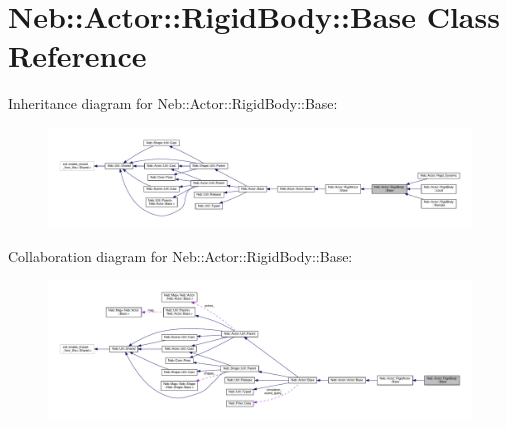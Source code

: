 \hypertarget{classNeb_1_1Actor_1_1RigidBody_1_1Base}{\section{Neb\-:\-:Actor\-:\-:Rigid\-Body\-:\-:Base Class Reference}
\label{classNeb_1_1Actor_1_1RigidBody_1_1Base}
}


Inheritance diagram for Neb\-:\-:Actor\-:\-:Rigid\-Body\-:\-:Base\-:
\nopagebreak
\begin{figure}[H]
\begin{center}
\leavevmode
\includegraphics[width=350pt]{classNeb_1_1Actor_1_1RigidBody_1_1Base__inherit__graph}
\end{center}
\end{figure}


Collaboration diagram for Neb\-:\-:Actor\-:\-:Rigid\-Body\-:\-:Base\-:
\nopagebreak
\begin{figure}[H]
\begin{center}
\leavevmode
\includegraphics[width=350pt]{classNeb_1_1Actor_1_1RigidBody_1_1Base__coll__graph}
\end{center}
\end{figure}

